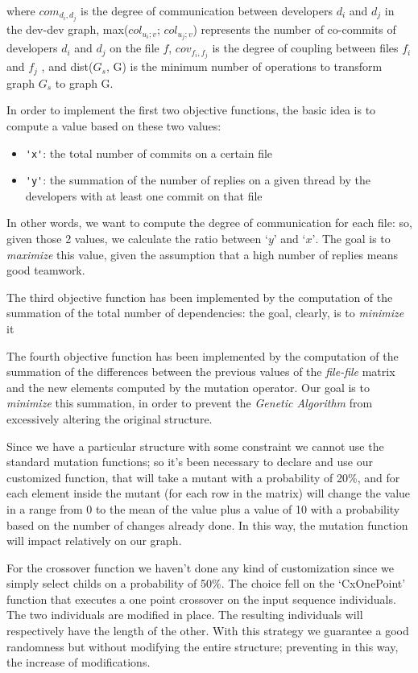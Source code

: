 \documentclass[sigconf]{acmart}
\begin{document}
where $com_{d_i,d_j}$ is the degree of communication between developers $d_i$ and $d_j$ in the dev-dev graph, max($col_{u_i;v}$; $col_{u_j;v}$) represents the number of co-commits of developers $d_i$ and $d_j$ on the file $f$, $cov_{f_i,f_j}$ is the degree of coupling between files $f_i$ and $f_j$ , and dist($G_s$, G) is the minimum number of operations to transform graph $G_s$ to graph G.

In order to implement the first two objective functions, the basic idea is to compute a value based on these two values:

\begin{itemize}
\item {\verb|'x'|}: the total number of commits on a certain file
\item {\verb|'y'|}: the summation of the number of replies on a given thread by the developers with at least one commit on that file
\end{itemize}

In other words, we want to compute the degree of communication for each file: so, given those 2 values, we calculate the ratio between $‘y’$ and $‘x’$.
The goal is to \textit{maximize} this value, given the assumption that a high number of replies means good teamwork.

The third objective function has been implemented by the computation of the summation of the total number of dependencies: the goal, clearly, is to \textit{minimize} it

The fourth objective function has been implemented by the computation of the summation of the differences between the previous values of the {\itshape file-file} matrix and the new elements computed by the mutation operator. Our goal is to \textit{minimize} this summation, in order to prevent the {\itshape Genetic Algorithm} from excessively altering the original structure.

Since we have a particular structure with some constraint we cannot use the standard mutation functions; so it’s been necessary to declare and use our customized function, that will take a mutant with a probability of 20\%, and for each element inside the mutant (for each row in the matrix) will change the value in a range from 0 to the mean of the value plus a value of 10 with a probability based on the number of changes already done.
In this way, the mutation function will impact relatively on our graph.

For the crossover function we haven’t done any kind of customization since we simply select childs on a probability of 50\%. The choice fell on the ‘CxOnePoint’ function that executes a one point crossover on the input sequence individuals. The two individuals are modified in place. The resulting individuals will respectively have the length of the other. With this strategy we guarantee a good randomness but without modifying the entire structure; preventing in this way, the increase of modifications.
\end{document}
